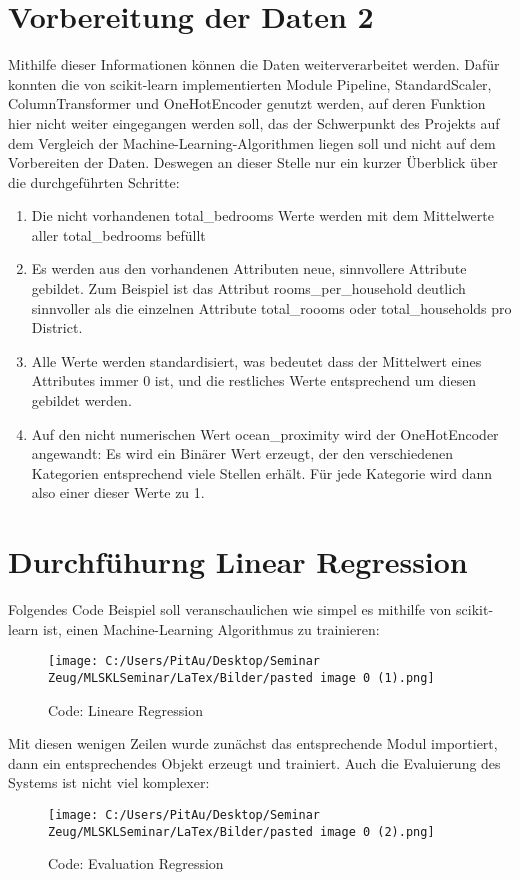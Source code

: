 \section{Vorbereitung der Daten 2}
\label{VorbereitungDerDaten2}
Mithilfe dieser Informationen können die Daten weiterverarbeitet werden. 
Dafür konnten die von scikit-learn implementierten Module Pipeline, StandardScaler, ColumnTransformer und OneHotEncoder genutzt werden, auf deren Funktion hier nicht weiter eingegangen werden soll, das der Schwerpunkt des Projekts auf dem Vergleich der Machine-Learning-Algorithmen liegen soll und nicht auf dem Vorbereiten der Daten. Deswegen an dieser Stelle nur ein kurzer Überblick über die durchgeführten Schritte:
\begin{enumerate}
\item Die nicht vorhandenen total\_bedrooms Werte werden mit dem Mittelwerte aller total\_bedrooms befüllt
\item Es werden aus den vorhandenen Attributen neue, sinnvollere Attribute gebildet. Zum Beispiel ist das Attribut rooms\_per\_household deutlich sinnvoller als die einzelnen Attribute total\_roooms oder total\_households pro District.
\item Alle Werte werden standardisiert, was bedeutet dass der Mittelwert eines Attributes immer 0 ist, und die restliches Werte entsprechend um diesen gebildet werden.
\item Auf den nicht numerischen Wert ocean\_proximity wird der OneHotEncoder angewandt: Es wird ein Binärer Wert erzeugt, der den verschiedenen Kategorien entsprechend viele Stellen erhält. Für jede Kategorie wird dann also einer dieser Werte zu 1.
\end{enumerate}

\section{Durchfühurng Linear Regression}
\label{durchfühurngLinearRegression}
Folgendes Code Beispiel soll veranschaulichen wie simpel es mithilfe von scikit-learn ist, einen Machine-Learning Algorithmus zu trainieren:
\begin{figure}
	\texttt{[image: C:/Users/PitAu/Desktop/Seminar Zeug/MLSKLSeminar/LaTex/Bilder/pasted image 0 (1).png]}
	\caption{Code: Lineare Regression}
\end{figure}
Mit diesen wenigen Zeilen wurde zunächst das entsprechende Modul importiert, dann ein entsprechendes Objekt erzeugt und trainiert. 
Auch die Evaluierung des Systems ist nicht viel komplexer:
\newline
\begin{figure}
	\texttt{[image: C:/Users/PitAu/Desktop/Seminar Zeug/MLSKLSeminar/LaTex/Bilder/pasted image 0 (2).png]}
	\caption{Code: Evaluation Regression}
\end{figure}

